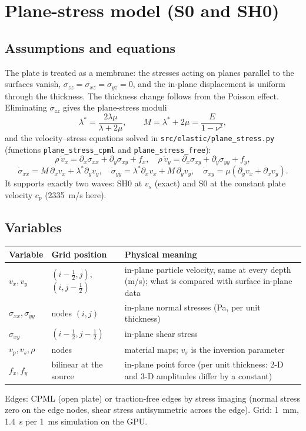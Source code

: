 \documentclass[11pt,a4paper]{article}
\newcommand{\code}[1]{\texttt{\footnotesize #1}}
\begin{document}
\FloatBarrier
\section{Plane-stress model (S0 and SH0)}
\subsection{Assumptions and equations}
The plate is treated as a membrane: the stresses acting on planes parallel to the surfaces vanish,
$\sigma_{zz} = \sigma_{xz} = \sigma_{yz} = 0$, and the in-plane displacement is uniform through the thickness.
The thickness change follows from the Poisson effect. Eliminating $\sigma_{zz}$ gives the plane-stress moduli
\[
\lambda^{*} = \frac{2\lambda\mu}{\lambda + 2\mu}, \qquad M = \lambda^{*} + 2\mu = \frac{E}{1-\nu^2},
\]
and the velocity--stress equations solved in \code{src/elastic/plane\_stress.py}
(functions \code{plane\_stress\_cpml} and \code{plane\_stress\_free}):
\[
\rho\,\dot v_x = \partial_x\sigma_{xx} + \partial_y\sigma_{xy} + f_x, \quad
\rho\,\dot v_y = \partial_x\sigma_{xy} + \partial_y\sigma_{yy} + f_y,
\]
\[
\dot\sigma_{xx} = M\,\partial_x v_x + \lambda^{*}\partial_y v_y, \quad
\dot\sigma_{yy} = \lambda^{*}\partial_x v_x + M\,\partial_y v_y, \quad
\dot\sigma_{xy} = \mu(\partial_y v_x + \partial_x v_y).
\]
It supports exactly two waves: SH0 at $v_s$ (exact) and S0 at the constant plate velocity $c_p$ (2335~m/s here).

\subsection{Variables}
\begin{table}[h]
\centering\small
\begin{tabularx}{\textwidth}{@{}llL@{}}
\toprule
Variable & Grid position & Physical meaning \\
\midrule
$v_x, v_y$ & $(i-\tfrac12, j)$, $(i, j-\tfrac12)$ & in-plane particle velocity, same at every depth (m/s); what is compared with surface in-plane data \\
$\sigma_{xx}, \sigma_{yy}$ & nodes $(i,j)$ & in-plane normal stresses (Pa, per unit thickness) \\
$\sigma_{xy}$ & $(i-\tfrac12, j-\tfrac12)$ & in-plane shear stress \\
$v_p, v_s, \rho$ & nodes & material maps; $v_s$ is the inversion parameter \\
$f_x, f_y$ & bilinear at the source & in-plane point force (per unit thickness: 2-D and 3-D amplitudes differ by a constant) \\
\bottomrule
\end{tabularx}
\end{table}
Edges: CPML (open plate) or traction-free edges by stress imaging (normal stress zero on the edge nodes, shear stress
antisymmetric across the edge). Grid: 1~mm, 1.4~s per 1~ms simulation on the GPU.
\end{document}
